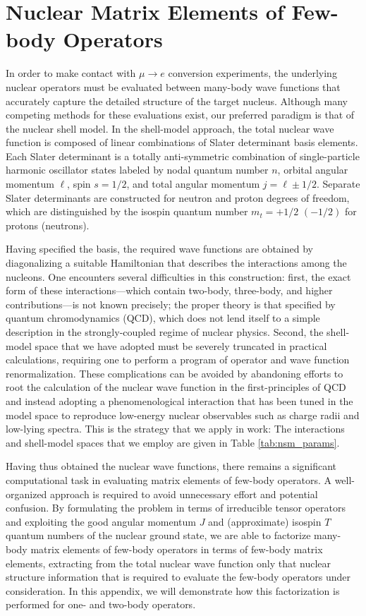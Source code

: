 \documentclass[12pt,letterpaper]{book}
\begin{document}
\chapter{Nuclear Matrix Elements of Few-body Operators}
\label{app:density}
\thispagestyle{headings}
In order to make contact with $\mu\rightarrow e$ conversion experiments, the underlying nuclear operators must be evaluated between many-body wave functions that accurately capture the detailed structure of the target nucleus. Although many competing methods for these evaluations exist, our preferred paradigm is that of the nuclear shell model. In the shell-model approach, the total nuclear wave function is composed of linear combinations of Slater determinant basis elements. Each Slater determinant is a totally anti-symmetric combination of single-particle harmonic oscillator states labeled by nodal quantum number $n$, orbital angular momentum $\ell$, spin $s=1/2$, and total angular momentum $j=\ell\pm 1/2$. Separate Slater determinants are constructed for neutron and proton degrees of freedom, which are distinguished by the isospin quantum number $m_t=+1/2$ $(-1/2)$ for protons (neutrons). 

Having specified the basis, the required wave functions are obtained by diagonalizing a suitable Hamiltonian that describes the interactions among the nucleons. One encounters several difficulties in this construction: first, the exact form of these interactions---which contain two-body, three-body, and higher contributions---is not known precisely; the proper theory is that specified by quantum chromodynamics (QCD), which does not lend itself to a simple description in the strongly-coupled regime of nuclear physics. Second, the shell-model space that we have adopted must be severely truncated in practical calculations, requiring one to perform a program of operator and wave function renormalization. These complications can be avoided by abandoning efforts to root the calculation of the nuclear wave function in the first-principles of QCD and instead adopting a phenomenological interaction that has been tuned in the model space to reproduce low-energy nuclear observables such as charge radii and low-lying spectra. This is the strategy that we apply in work: The interactions and shell-model spaces that we employ are given in Table \ref{tab:nsm_params}. 

Having thus obtained the nuclear wave functions, there remains a significant computational task in evaluating matrix elements of few-body operators. A well-organized approach is required to avoid unnecessary effort and potential confusion. By formulating the problem in terms of irreducible tensor operators and exploiting the good angular momentum $J$ and (approximate) isospin $T$ quantum numbers of the nuclear ground state, we are able to factorize many-body matrix elements of few-body operators in terms of few-body matrix elements, extracting from the total nuclear wave function only that nuclear structure information that is required to evaluate the few-body operators under consideration. In this appendix, we will demonstrate how this factorization is performed for one- and two-body operators.
\end{document}
